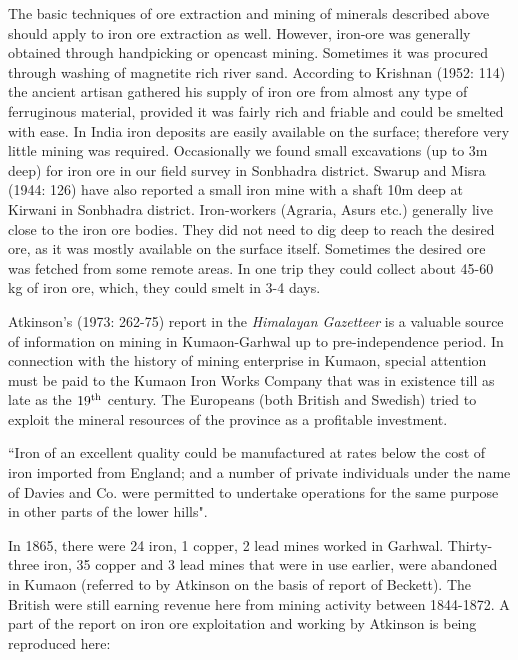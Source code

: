 The basic techniques of ore extraction and mining of minerals described above should apply to iron ore extraction as well. However, iron-ore was generally obtained through handpicking or opencast mining. Sometimes it was procured through washing of magnetite rich river sand. According to Krishnan (1952: 114) the ancient artisan gathered his supply of iron ore from almost any type of ferruginous material, provided it was fairly rich and friable and could be smelted with ease. In India iron deposits are easily available on the surface; therefore very little mining was required. Occasionally we found small excavations (up to 3m deep) for iron ore in our field survey in Sonbhadra district. Swarup and Misra (1944: 126) have also reported a small iron mine with a shaft 10m deep at Kirwani in Sonbhadra district. Iron-workers (Agraria, Asurs etc.) generally live close to the iron ore bodies. They did not need to dig deep to reach the desired ore, as it was mostly available on the surface itself. Sometimes the desired ore was fetched from some remote areas. In one trip they could collect about 45-60 kg of iron ore, which, they could smelt in 3-4 days.

Atkinson's (1973: 262-75) report in the {\it Himalayan Gazetteer} is a valuable source of information on mining in Kumaon-Garhwal up to pre-independence period. In connection with the history of mining enterprise in Kumaon, special attention must be paid to the Kumaon Iron Works Company that was in existence till as late as the $19^{\rm th}$ century. The Europeans (both British and Swedish) tried to exploit the mineral resources of the province as a profitable investment.

 ``Iron of an excellent quality could be manufactured at rates below the cost of iron imported from England; and a number of private individuals under the name of Davies and Co. were permitted to undertake operations for the same purpose in other parts of the lower hills". 

In 1865, there were 24 iron, 1 copper, 2 lead mines worked in Garhwal. Thirty-three iron, 35 copper and 3 lead mines that were in use earlier, were abandoned in Kumaon (referred to by Atkinson on the basis of report of Beckett). The British were still earning revenue here from mining activity between 1844-1872. A part of the report on iron ore exploitation and working by Atkinson is being reproduced here:

